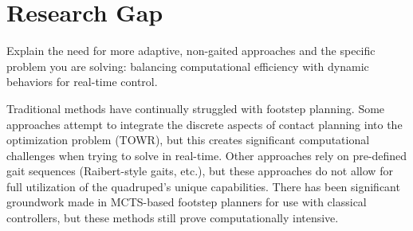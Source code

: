 \section{Research Gap}

\begin{outline}
  Explain the need for more adaptive, non-gaited approaches and the
  specific problem you are solving: balancing computational
  efficiency with dynamic behaviors for real-time control.
\end{outline}





Traditional methods have continually struggled with footstep planning.
Some approaches attempt to integrate the discrete aspects of contact
planning into the optimization problem (TOWR), but this creates
significant computational challenges when trying to solve in real-time.
Other approaches rely on pre-defined gait sequences (Raibert-style gaits, etc.),
but these approaches do not allow for full utilization of the quadruped's
unique capabilities. There has been significant groundwork made in MCTS-based
footstep planners for use with classical controllers, but these methods still
prove computationally intensive.

